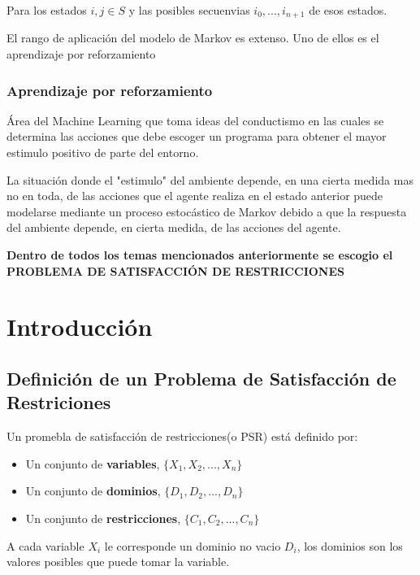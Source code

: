 \documentclass[a4paper]{article}
\begin{document}
Para los estados $i,j \in S$ y las posibles secuenvias $i_{0},..., i_{n+1}$ de esos estados.

El rango de aplicación del modelo de Markov es extenso. Uno de ellos es el aprendizaje por reforzamiento

\subsubsection*{Aprendizaje por reforzamiento}
Área del Machine Learning que toma ideas del conductismo en las cuales se determina las acciones que debe escoger un programa para obtener el mayor estimulo positivo de parte del entorno.

La situación donde el "estimulo" del ambiente depende, en una cierta medida mas no en toda, de las acciones que el agente realiza en el estado anterior puede modelarse mediante un proceso estocástico de Markov debido a que la respuesta del ambiente depende, en cierta medida, de las acciones del agente.


\textbf{
Dentro de todos los temas mencionados anteriormente se escogio el PROBLEMA DE SATISFACCIÓN DE RESTRICCIONES}
% 



\section{Introducci\'on}
\subsection{Definición de un  Problema de Satisfacción de Restriciones}
Un promebla de satisfacción de restricciones(o PSR) está definido por:
\begin{itemize}
	\item Un conjunto de \textbf{variables}, $\{X_1, X_2,..., X_n\}$
	\item Un conjunto de \textbf{dominios}, $\{D_1, D_2,..., D_n\}$
	\item Un conjunto de \textbf{restricciones}, $\{C_1, C_2,..., C_n\}$
\end{itemize} 
A cada variable $X_i$ le corresponde un dominio no vacio $D_i$, los dominios son los valores posibles que puede tomar la variable. 
\end{document}
